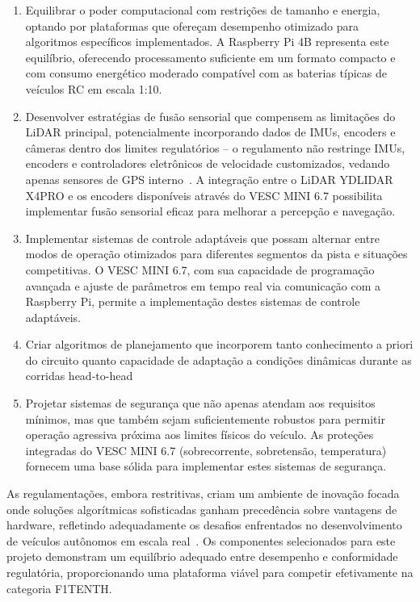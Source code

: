 \begin{enumerate}
      \item Equilibrar o poder computacional com restrições de tamanho e energia, optando
            por plataformas que ofereçam desempenho otimizado para algoritmos específicos
            implementados. A Raspberry Pi 4B representa este equilíbrio, oferecendo
            processamento suficiente em um formato compacto e com consumo energético
            moderado compatível com as baterias típicas de veículos RC em escala 1:10.

      \item Desenvolver estratégias de fusão sensorial que compensem as limitações do LiDAR
            principal, potencialmente incorporando dados de IMUs, encoders e câmeras dentro
            dos limites regulatórios -- o regulamento não restringe IMUs, encoders e
            controladores eletrônicos de velocidade customizados, vedando apenas sensores
            de GPS interno~\cite{F1TENTHRules2023}. A integração entre o LiDAR
            YDLIDAR X4PRO e os encoders disponíveis através do VESC MINI 6.7 possibilita
            implementar fusão sensorial eficaz para melhorar a percepção e navegação.

      \item Implementar sistemas de controle adaptáveis que possam alternar entre modos de
            operação otimizados para diferentes segmentos da pista e situações
            competitivas. O VESC MINI 6.7, com sua capacidade de programação avançada e
            ajuste de parâmetros em tempo real via comunicação com a Raspberry Pi, permite
            a implementação destes sistemas de controle adaptáveis.

      \item Criar algoritmos de planejamento que incorporem tanto conhecimento a priori do
            circuito quanto capacidade de adaptação a condições dinâmicas durante as
            corridas head-to-head~\cite{Betz2022Survey}

      \item Projetar sistemas de segurança que não apenas atendam aos requisitos mínimos,
            mas que também sejam suficientemente robustos para permitir operação agressiva
            próxima aos limites físicos do veículo. As proteções integradas do VESC MINI
            6.7 (sobrecorrente, sobretensão, temperatura) fornecem uma base sólida para
            implementar estes sistemas de segurança.
\end{enumerate}

As regulamentações, embora restritivas, criam um ambiente de inovação focada
onde soluções algorítmicas sofisticadas ganham precedência sobre vantagens de
hardware, refletindo adequadamente os desafios enfrentados no desenvolvimento
de veículos autônomos em escala real~\cite{OKelly2020F1TENTH}. Os componentes
selecionados para este projeto demonstram um equilíbrio adequado entre
desempenho e conformidade regulatória, proporcionando uma plataforma viável
para competir efetivamente na categoria F1TENTH.